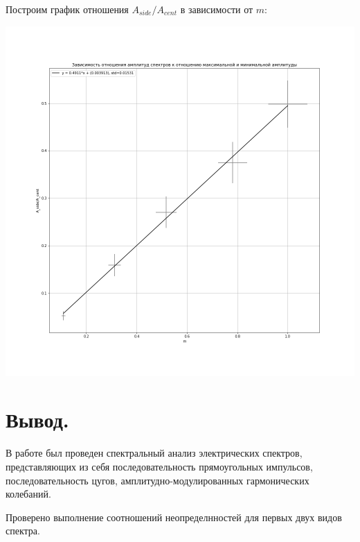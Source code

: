 \documentclass[12pt,a4paper]{article}
\begin{document}
        Построим график отношения $A_{side}/A_{cent}$ в зависимости от $m$:
        
        \begin{center}
            \includegraphics[width=\linewidth]{img/7.png}    
        \end{center}
        
\section{Вывод.}
    В работе был проведен спектральный анализ электрических спектров, представляющих из себя последовательность прямоугольных импульсов, последовательность цугов, амплитудно-модулированных гармонических колебаний.
    
    Проверено выполнение соотношений неопределнностей для первых двух видов спектра.
\end{document}
